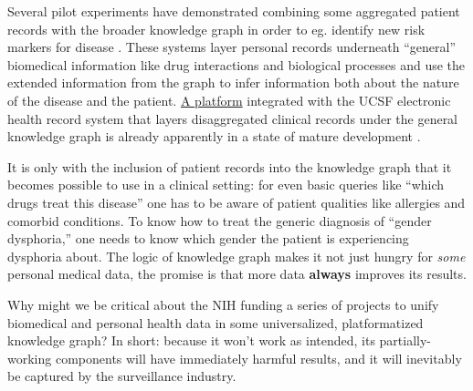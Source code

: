 Several pilot experiments have demonstrated combining some aggregated
patient records with the broader knowledge graph in order to eg.
identify new risk markers for disease \cite{morrisScalablePrecisionMedicine2023, nelsonEmbeddingElectronicHealth2021, translatorconsortiumClinicalDataServices2020, nelsonIntegratingBiomedicalResearch2019} . These systems layer
personal records underneath ``general'' biomedical information like drug
interactions and biological processes and use the extended information
from the graph to infer information both about the nature of the disease
and the patient. \href{https://www.matebioservices.com/bridge}{A
platform} integrated with the UCSF electronic health record system that
layers disaggregated clinical records under the general knowledge graph
is already apparently in a state of mature development \cite{universityofcaliforniasanfranciscoBRIDGE} .

It is only with the inclusion of patient records into the knowledge
graph that it becomes possible to use in a clinical setting: for even
basic queries like ``which drugs treat this disease'' one has to be
aware of patient qualities like allergies and comorbid conditions. To
know how to treat the generic diagnosis of ``gender dysphoria,'' one
needs to know which gender the patient is experiencing dysphoria about.
The logic of knowledge graph makes it not just hungry for \emph{some}
personal medical data, the promise is that more data \textbf{always}
improves its results.

Why might we be critical about the NIH funding a series of projects to
unify biomedical and personal health data in some universalized,
platformatized knowledge graph? In short: because it won't work as
intended, its partially-working components will have immediately harmful
results, and it will inevitably be captured by the surveillance
industry.

